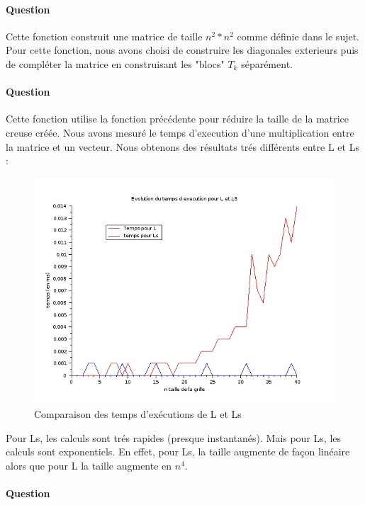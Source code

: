 \documentclass[11pt]{article}
\newcounter{question_num}
\begin{document}
	\paragraph{Question  \\}
	Cette fonction construit une matrice de taille $n^2*n^2$ comme définie dans le sujet. Pour cette fonction, nous avons choisi de construire les diagonales exterieurs puis de compléter la matrice en construisant les "blocs" $T_{k}$ séparément.
	
	\paragraph{Question  \\}
	Cette fonction utilise la fonction précédente pour réduire la taille de la matrice creuse créée. Nous avons mesuré le temps d'execution d'une multiplication entre la matrice et un vecteur. Nous obtenons des résultats trés différents entre L et Ls :
	\begin{figure}[H]
	\begin{center}
		\includegraphics[width=8 cm]{Comparaison_L_Ls.jpeg}
		\caption{ Comparaison des temps d'exécutions de L et Ls}
	\end{center}
	\end{figure}
	
	Pour Ls, les calculs sont trés rapides (presque instantanés). Mais pour Ls, les calculs sont exponentiels. En effet, pour Ls, la taille augmente de façon linéaire alors que pour L la taille augmente en $n^{4}$.
	
	\paragraph{Question  \\}
	
\end{document}
